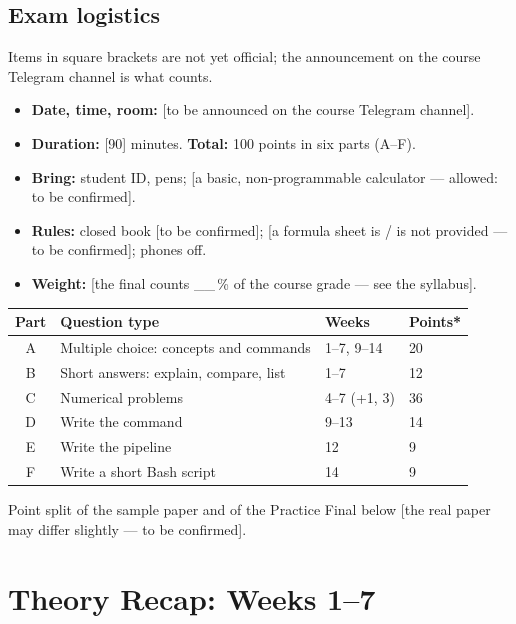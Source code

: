 \documentclass[11pt,a4paper]{article}
\begin{document}
\subsection{Exam logistics}
Items in square brackets are not yet official; the announcement on the course Telegram channel is what counts.
\begin{itemize}
  \item \textbf{Date, time, room:} [to be announced on the course Telegram channel].
  \item \textbf{Duration:} [90] minutes. \textbf{Total:} 100 points in six parts (A--F).
  \item \textbf{Bring:} student ID, pens; [a basic, non-programmable calculator --- allowed: to be confirmed].
  \item \textbf{Rules:} closed book [to be confirmed]; [a formula sheet is / is not provided --- to be confirmed]; phones off.
  \item \textbf{Weight:} [the final counts \_\_\,\% of the course grade --- see the syllabus].
\end{itemize}

\begin{center}
\renewcommand{\arraystretch}{1.2}
\begin{tabularx}{\linewidth}{@{}c>{\raggedright\arraybackslash}Xll@{}}
\toprule
\textbf{Part} & \textbf{Question type} & \textbf{Weeks} & \textbf{Points*} \\
\midrule
A & Multiple choice: concepts and commands & 1--7, 9--14 & 20 \\
B & Short answers: explain, compare, list & 1--7 & 12 \\
C & Numerical problems & 4--7 (+1, 3) & 36 \\
D & Write the command & 9--13 & 14 \\
E & Write the pipeline & 12 & 9 \\
F & Write a short Bash script & 14 & 9 \\
\bottomrule
\end{tabularx}
\end{center}
{\small *Point split of the sample paper and of the Practice Final below [the real paper may differ slightly --- to be confirmed].}

\section{Theory Recap: Weeks 1--7}
\label{sec:theory}
\end{document}
